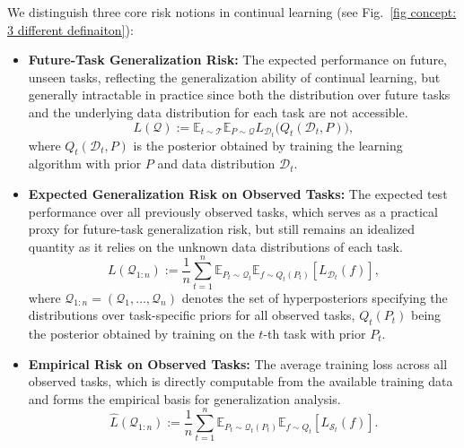 \documentclass[letterpaper]{article} %
\begin{document}


We distinguish three core risk notions in continual learning (see Fig.~\ref{fig concept: 3 different definaiton}):
\begin{itemize}
    \item \textbf{Future-Task Generalization Risk:} The expected performance on future, unseen tasks, reflecting the generalization ability of continual learning, but generally intractable in practice since both the distribution over future tasks and the underlying data distribution for each task are not accessible.
    \begin{equation}
        L(\mathcal{Q}) := \mathbb{E}_{t \sim \mathcal{T}}\mathbb{E}_{P \sim \mathcal{Q}}L_{\mathcal{D}_t}\big(Q_t(\mathcal{D}_t, P)\big),
    \end{equation}
    where $Q_t(\mathcal{D}_t, P )$ is the posterior obtained by training the learning algorithm with prior $P$ and data distribution $\mathcal{D}_t$.
    \item \textbf{Expected Generalization Risk on Observed Tasks:}  The expected test performance over all previously observed tasks, which serves as a practical proxy for future-task generalization risk, but still remains an idealized quantity as it relies on the unknown data distributions of each task.
    \begin{equation}
        L(\mathcal{Q}_{1:n}) := \frac{1}{n} \sum_{t=1}^n \mathbb{E}_{P_{t} \sim \mathcal{Q}_{t}} \mathbb{E}_{f \sim Q_t(P_t)} [ L_{\mathcal{D}_t}(f) ],
    \end{equation}
    where  $\mathcal{Q}_{1:n} = (\mathcal{Q}_1, \ldots, \mathcal{Q}_n)$ denotes the set of hyperposteriors specifying the distributions over task-specific priors for all observed tasks, $Q_t(P_t)$ being the posterior obtained by training on the $t$-th task with prior $P_t$.
    \item \textbf{Empirical Risk on Observed Tasks:} The average training loss across all observed tasks, which is directly computable from the available training data and forms the empirical basis for generalization analysis.
    \begin{equation}
        \hat{L}(\mathcal{Q}_{1:n}) := \frac{1}{n} \sum_{t=1}^n \mathbb{E}_{P_t \sim \mathcal{Q}_t(P_t)} \mathbb{E}_{f \sim Q_t}  [ L_{\mathcal{S}_t}(f) ].
    \end{equation}
\end{itemize}
\end{document}
